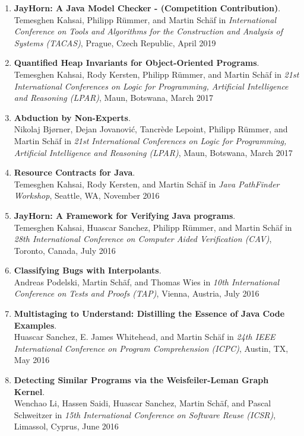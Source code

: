 \begin{enumerate}
\item \textbf{JayHorn: A Java Model Checker - (Competition Contribution)}.
\\ Temesghen Kahsai, Philipp R\"ummer, and Martin Sch\"af in 
\emph{International Conference on Tools and Algorithms for the Construction and Analysis of Systems (TACAS)},
Prague, Czech Republic, April 2019

\item \textbf{Quantified Heap Invariants for Object-Oriented Programs}.
\\ Temesghen Kahsai, Rody Kersten, Philipp R\"ummer, and Martin Sch\"af in 
\emph{21st International Conferences on Logic for Programming, Artificial Intelligence and Reasoning (LPAR)},
Maun, Botswana, March 2017

\item \textbf{Abduction by Non-Experts}.
\\ Nikolaj Bj{\o}rner, Dejan Jovanovi\'c, Tancr\`ede Lepoint, Philipp R\"ummer, and Martin Sch\"af in 
\emph{21st International Conferences on Logic for Programming, Artificial Intelligence and Reasoning (LPAR)},
Maun, Botswana, March 2017


\item \textbf{Resource Contracts for Java}.
\\ Temesghen Kahsai, Rody Kersten, and Martin Sch\"af in 
\emph{Java PathFinder Workshop},
Seattle, WA, November 2016

\item \textbf{JayHorn: A Framework for Verifying Java programs}.
\\ Temesghen Kahsai, Huascar Sanchez, Philipp R\"ummer, and Martin Sch\"af in 
\emph{28th International Conference on Computer Aided Verification (CAV)},
Toronto, Canada, July 2016


\item \textbf{Classifying Bugs with Interpolants}.
\\ Andreas Podelski, Martin Sch\"af, and Thomas Wies in 
\emph{10th International Conference on Tests and Proofs (TAP)},
Vienna, Austria, July 2016


\item \textbf{Multistaging to Understand: Distilling the Essence of Java Code Examples}.
\\ Huascar Sanchez, E. James Whitehead, and Martin Sch\"af in 
\emph{24th IEEE International Conference on Program Comprehension (ICPC)},
Austin, TX, May 2016


\item \textbf{Detecting Similar Programs via the Weisfeiler-Leman Graph Kernel}.
\\ Wenchao Li, Hassen Saidi, Huascar Sanchez, Martin Sch\"af, and Pascal
Schweitzer in \emph{15th International Conference on Software Reuse (ICSR)},
Limassol, Cyprus, June 2016



\end{enumerate}

